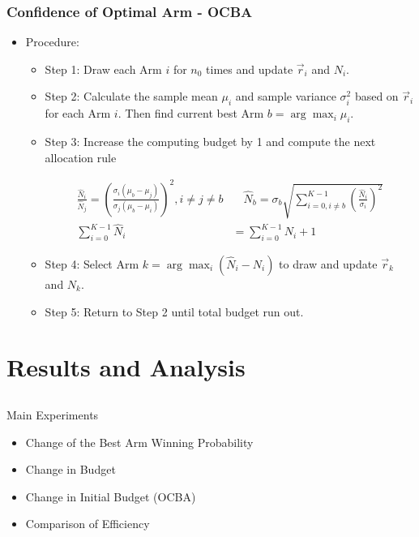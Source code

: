 \documentclass[compress]{beamer}
\begin{document}
\begin{frame}
\frametitle{Confidence of Optimal Arm - OCBA}
\begin{itemize}
  \item Procedure:
    \begin{itemize}
      \item Step 1: Draw each Arm $i$ for $n_{0}$ times and update $\vec r_{i}$ and $N_{i}$.
      \item Step 2: Calculate the sample mean $\mu_{i}$ and sample variance $\sigma_{i}^{2}$ based on $\vec r_{i}$ for each Arm $i$. Then find current best Arm $b = \arg \max_{i} \mu_{i}$.
      \item Step 3: Increase the computing budget by 1 and compute the next allocation rule
                    \begin{scriptsize}
                    \begin{align}
                      \frac{\hat N_{i}}{\hat N_{j}} = (\frac{\sigma_{i} (\mu_{b} - \mu_{j})}{\sigma_{j} (\mu_{b} - \mu_{i})})^{2}, i \neq j \neq b & \quad \hat N_{b} = \sigma_{b} \sqrt{\sum_{i=0,i \neq b}^{K-1} (\frac{\hat N_{i}}{\sigma_{i}})^{2} } \\
                      \sum_{i=0}^{K-1} \hat N_{i} & = \sum_{i=0}^{K-1} N_{i} + 1
                    \end{align}
                    \end{scriptsize}
       \item Step 4: Select Arm $k = \arg \max_{i} (\hat N_{i} - N_{i})$ to draw and update $\vec r_{k}$ and $N_{k}$.
       \item Step 5: Return to Step 2 until total budget run out.
    \end{itemize}
\end{itemize}
\end{frame}



\section{Results and Analysis}

\subsection{}

\begin{frame}
Main Experiments
\begin{itemize}
\item Change of the Best Arm Winning Probability
\item Change in Budget
\item Change in Initial Budget (OCBA)
\item Comparison of Efficiency
\end{itemize}
\end{frame}
\end{document}
